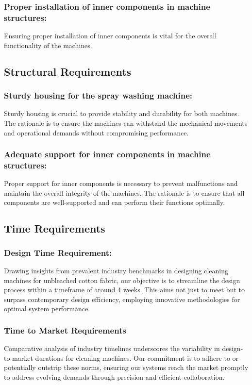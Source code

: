 \documentclass[12pt]{article} %
\begin{document}
 \subsubsection{Proper installation of inner components in machine structures:} Ensuring proper installation of inner components is vital for the overall functionality of the machines.
 


\subsection{Structural Requirements}

 \subsubsection{Sturdy housing for the spray washing machine:} Sturdy housing is crucial to provide stability and durability for both machines. The rationale is to ensure the machines can withstand the mechanical movements and operational demands without compromising performance.

 
 \subsubsection{Adequate support for inner components in machine structures:} Proper support for inner components is necessary to prevent malfunctions and maintain the overall integrity of the machines. The rationale is to ensure that all components are well-supported and can perform their functions optimally.



\subsection{Time Requirements}

 \subsubsection{Design Time Requirement:} Drawing insights from prevalent industry benchmarks in designing cleaning machines for unbleached cotton fabric, our objective is to streamline the design process within a timeframe of around 4 weeks. This aims not just to meet but to surpass contemporary design efficiency, employing innovative methodologies for optimal system performance.

 
 \subsubsection{Time to Market Requirements} Comparative analysis of industry timelines underscores the variability in design-to-market durations for cleaning machines. Our commitment is to adhere to or potentially outstrip these norms, ensuring our systems reach the market promptly to address evolving demands through precision and efficient collaboration.
\end{document}
